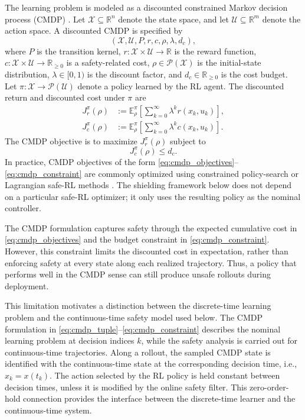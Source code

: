 \documentclass[letterpaper,10pt,conference]{ieeeconf}
\newcommand{\R}{\mathbb{R}}
\newcommand{\xv}{x}
\newcommand{\Uv}{\mathcal{U}}
\newcommand{\Xrl}{\mathcal{X}}
\begin{document}
The learning problem is modeled as a discounted constrained Markov decision
process (CMDP) \cite{altman1999cmdp,sutton2018rl}. Let
$\Xrl\subseteq\R^n$ denote the state space, and let
$\Uv\subseteq\R^m$ denote the action space. A discounted CMDP is specified by
\begin{equation}
    (\Xrl,\Uv,P,r,c,\rho,\lambda,d_c),
    \label{eq:cmdp_tuple}
\end{equation}
where $P$ is the transition kernel, $r:\Xrl\times\Uv\to\R$ is the reward
function, $c:\Xrl\times\Uv\to\R_{\ge 0}$ is a safety-related cost,
$\rho\in\mathcal{P}(\Xrl)$ is the initial-state distribution,
$\lambda\in[0,1)$ is the discount factor, and $d_c\in\R_{\ge 0}$ is the cost
budget. Let $\pi:\Xrl\to\mathcal{P}(\Uv)$ denote a policy learned by the RL
agent. The discounted return and discounted cost under $\pi$ are
\begin{equation}
\begin{aligned}
    J_r^\pi(\rho)
    &:=
    \mathbb{E}_{\rho}^{\pi}\!\left[\sum_{k=0}^{\infty}\lambda^k r(x_k,u_k)\right],\\
    J_c^\pi(\rho)
    &:=
    \mathbb{E}_{\rho}^{\pi}\!\left[\sum_{k=0}^{\infty}\lambda^k c(x_k,u_k)\right].
\end{aligned}
\label{eq:cmdp_objectives}
\end{equation}
The CMDP objective is to maximize $J_r^\pi(\rho)$ subject to
\begin{equation}
    J_c^\pi(\rho)\le d_c.
    \label{eq:cmdp_constraint}
\end{equation}
In practice, CMDP objectives of the form
\eqref{eq:cmdp_objectives}--\eqref{eq:cmdp_constraint} are commonly optimized
using constrained policy-search or Lagrangian safe-RL methods
\cite{achiam2017cpo,tessler2019rcpo}. The shielding framework below does not
depend on a particular safe-RL optimizer; it only uses the resulting policy as
the nominal controller.

The CMDP formulation captures safety through the expected cumulative cost in
\eqref{eq:cmdp_objectives} and the budget constraint in
\eqref{eq:cmdp_constraint}. However, this constraint limits the discounted cost
in expectation, rather than enforcing safety at every state along each realized
trajectory. Thus, a policy that performs well in the CMDP sense can still
produce unsafe rollouts during deployment.

This limitation motivates a distinction between the discrete-time learning
problem and the continuous-time safety model used below. The CMDP formulation
in \eqref{eq:cmdp_tuple}--\eqref{eq:cmdp_constraint} describes the nominal
learning problem at decision indices $k$, while the safety analysis is carried
out for continuous-time trajectories. Along a rollout, the sampled CMDP state
is identified with the continuous-time state at the corresponding decision
time, i.e., $x_k=\xv(t_k)$. The action selected by the RL policy is held
constant between decision times, unless it is modified by the online safety
filter. This zero-order-hold connection provides the interface between the
discrete-time learner and the continuous-time system.
\end{document}
